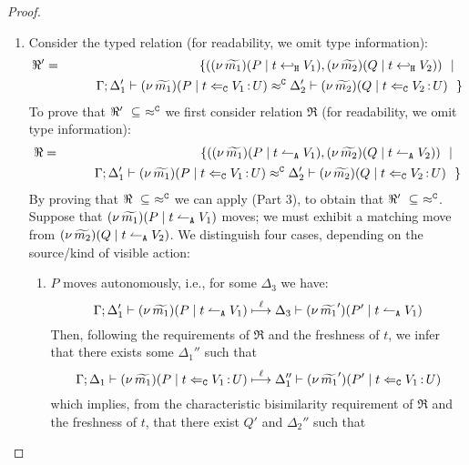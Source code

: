 \begin{proof}
\begin{enumerate}[1.]
		\item	Consider the typed relation (for readability, we omit type information):
				\begin{eqnarray*}
					\Re'	&=&		\{	((\nu\, \widetilde{m_1})(P \;|\; t \hookleftarrow_{\mathtt{H}} V_1),
										(\nu\, \widetilde{m_2})(Q \;|\; t \hookleftarrow_{\mathtt{H}} V_2))
								\ \ |\ \ \\
						&&			\qquad \Gamma; \Delta_1' \vdash (\nu\, \widetilde{m_1})(P \;|\; t \Leftarrow_{\mathtt{C}} V_1{\,:\,}U) \approx^\mathtt{C} \Delta_2' \vdash (\nu\, \widetilde{m_2})(Q \;|\; t \Leftarrow_{\mathtt{C}} V_2{\,:\,}U)~~\}
				\end{eqnarray*}
				To prove that $\Re'\ \subseteq\ \fwb$ we
				first consider relation $\Re$ (for readability, we omit type information):
				\begin{eqnarray*}
					\Re	&=&		\{	((\nu\, \widetilde{m_1})(P \;|\; t \leftharpoonup_\mathtt{A} V_1),
										(\nu\, \widetilde{m_2})(Q \;|\; t \leftharpoonup_\mathtt{A} V_2))
								\ \ |\ \ \\
						&&			\qquad \Gamma; \Delta_1' \vdash (\nu\, \widetilde{m_1})(P \;|\; t \Leftarrow_{\mathtt{C}} V_1{\,:\,}U) \approx^\mathtt{C} \Delta_2' \vdash (\nu\, \widetilde{m_2})(Q \;|\; t \Leftarrow_{\mathtt{C}} V_2{\,:\,}U)~~\}
				\end{eqnarray*}
				By proving that $\Re\ \subseteq\ \fwb$ we can apply  (Part 3), to
				obtain that $\Re'\ \subseteq\ \fwb$.
Suppose that $(\nu\, \widetilde{m_1})(P \;|\; t \leftharpoonup_\mathtt{A} V_1)$ moves; we must exhibit a matching move from
$(\nu\, \widetilde{m_2})(Q \;|\; t \leftharpoonup_\mathtt{A} V_2)$.
			We distinguish four cases, depending on the source/kind of visible action: 
				\begin{enumerate}
					\item $P$ moves autonomously, i.e., for some $\Delta_3$ we have:
						\[
							\Gamma; \Delta_1' \vdash (\nu\, \widetilde{m_1})(P \;|\; t \leftharpoonup_\mathtt{A} V_1) \stackrel{\ell}{\longmapsto} \Delta_3 \vdash (\nu\, \widetilde{m_1}')(P' \;|\; t \leftharpoonup_\mathtt{A} V_1)
						\]
							Then, following the requirements of $\Re$ and the freshness of $t$, 
							we infer that there exists some $\Delta_1''$ such that
						\[
							\Gamma; \Delta_1 \vdash (\nu\, \widetilde{m_1})(P \;|\; t \Leftarrow_{\mathtt{C}} V_1{\,:\,}U) \stackrel{\ell}{\longmapsto} \Delta_1'' \vdash (\nu\, \widetilde{m_1}')(P' \;|\; t \Leftarrow_{\mathtt{C}} V_1{\,:\,}U)
						\]
							which implies, from the characteristic bisimilarity requirement of $\Re$ and
							the freshness of $t$, that there exist $Q'$ and $\Delta_2''$ such that

\end{enumerate}
\end{enumerate}
\end{proof}
